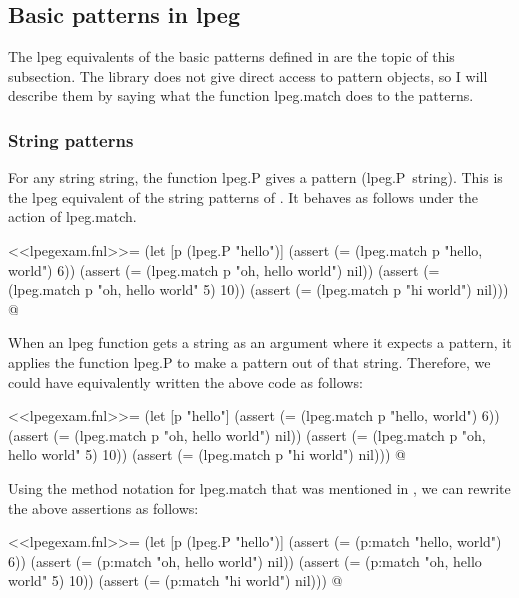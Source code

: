 \documentclass{article}
\begin{document}
\subsection{Basic patterns in lpeg}
\label{sec:7l3dfnco}

The \textsf{lpeg} equivalents of the basic patterns defined in
 are the topic of this subsection.  The library
does not give direct access to pattern objects, so I will describe
them by saying what the function \textsf{lpeg.match} does to the
patterns.

\subsubsection{String patterns}
\label{sec:lk201sc6}

For any string \textsf{string}, the function \textsf{lpeg.P} gives a
pattern \textsf{(lpeg.P~string)}.  This is the \textsf{lpeg}
equivalent of the string patterns of .  It behaves
as follows under the action of \textsf{lpeg.match}.

\begin{codechunk}
<<lpegexam.fnl>>=
(let [p (lpeg.P "hello")]
  (assert (= (lpeg.match p "hello, world") 6))
  (assert (= (lpeg.match p "oh, hello world") nil))
  (assert (= (lpeg.match p "oh, hello world" 5) 10))
  (assert (= (lpeg.match p "hi world") nil)))
@
\end{codechunk}

When an \textsf{lpeg} function gets a string as an argument where it
expects a pattern, it applies the function \textsf{lpeg.P} to make a
pattern out of that string.  Therefore, we could have equivalently
written the above code as follows:
\begin{codechunk}
<<lpegexam.fnl>>=
(let [p "hello"]
  (assert (= (lpeg.match p "hello, world") 6))
  (assert (= (lpeg.match p "oh, hello world") nil))
  (assert (= (lpeg.match p "oh, hello world" 5) 10))
  (assert (= (lpeg.match p "hi world") nil)))
@
\end{codechunk}

Using the method notation for \textsf{lpeg.match} that was mentioned
in , we can rewrite the above assertions as
follows:
\begin{codechunk}
<<lpegexam.fnl>>=
(let [p (lpeg.P "hello")]
  (assert (= (p:match "hello, world") 6))
  (assert (= (p:match "oh, hello world") nil))
  (assert (= (p:match "oh, hello world" 5) 10))
  (assert (= (p:match "hi world") nil)))
@
\end{codechunk}


\bibsection

\nowebchunkssection

\nowebindexsection
\end{document}
